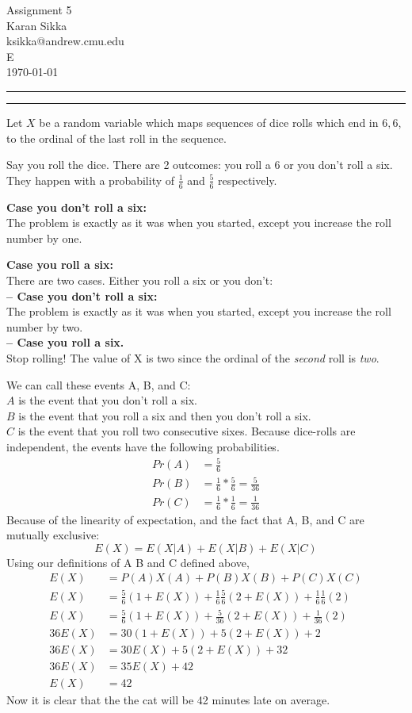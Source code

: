 \documentclass[11pt]{article}
\makeatletter
\newcounter{questionCounter}
\newcounter{partCounter}[questionCounter]
\newenvironment{question}[2][\arabic{questionCounter}]{%
    \setcounter{partCounter}{0}%
    \vspace{.25in} \hrule \vspace{0.5em}%
        \noindent{\bf #2}%
    \vspace{0.8em} \hrule \vspace{.10in}%
    \addtocounter{questionCounter}{1}%
}{}
\newcommand{\myname}{Karan Sikka}
\newcommand{\myandrew}{ksikka@andrew.cmu.edu}
\newcommand{\myhwname}{Assignment 5}
\newcommand{\myrecitation}{E}
\makeatother
\begin{document}
\thispagestyle{plain}
\begin{center}
{\Large \myhwname} \\
\myname \\
\myandrew \\
\myrecitation \\
\today
\end{center}
\begin{question}{Through the Rabbit Hole}
Let $X$ be a random variable which maps sequences of dice rolls
which end in $6,6$, to the ordinal of the last roll in the sequence.

Say you roll the dice. There are 2 outcomes: you roll a 6 or you 
don't roll a six. They happen with a probability of $\frac{1}{6}$ and $\frac{5}{6}$ respectively.

\textbf{Case you don't roll a six:}\\
The problem is exactly as it was when you started, except you increase the roll number by one.

\textbf{Case you roll a six:}\\
  There are two cases. Either you roll a six or you don't:\\
  \textbf{-- Case you don't roll a six:}\\
    The problem is exactly as it was when you started, except you increase the
    roll number by two.\\
  \textbf{-- Case you roll a six.}\\
    Stop rolling! The value of X is two since the ordinal of the \emph{second} roll is \emph{two}.

We can call these events A, B, and C:\\
$A$ is the event that you don't roll a six.\\
$B$ is the event that you roll a six and then you don't roll a six.\\
$C$ is the event that you roll two consecutive sixes.
Because dice-rolls are independent, the events have the following probabilities.
\begin{align*}
Pr(A) &= \frac{5}{6}\\
Pr(B) &= \frac{1}{6} * \frac{5}{6} = \frac{5}{36}\\
Pr(C) &= \frac{1}{6} * \frac{1}{6} = \frac{1}{36}
\end{align*}
Because of the linearity of expectation, and the fact that A, B, and C are 
mutually exclusive:
$$E(X) = E(X | A) + E(X | B) + E(X | C)$$
Using our definitions of A B and C defined above,
\begin{align*}
E(X) &= P(A)X(A) + P(B)X(B) + P(C)X(C)\\
E(X) &= \frac{5}{6}(1+E(X)) + \frac{1}{6}\frac{5}{6}(2+E(X)) + \frac{1}{6}\frac{1}{6}(2)\\
E(X) &= \frac{5}{6}(1+E(X)) + \frac{5}{36}(2+E(X)) + \frac{1}{36}(2)\\
36E(X) &= 30(1+E(X)) + 5(2+E(X)) + 2\\
36E(X) &= 30E(X) + 5(2+E(X)) + 32\\
36E(X) &= 35E(X) + 42\\
E(X) &= 42
\end{align*}
Now it is clear that the the cat will be 42 minutes late on average.
\end{question}
\end{document}
